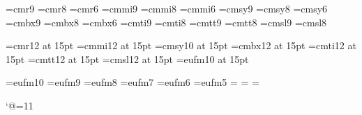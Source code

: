 \magnification{}

\font\ninerm=cmr9  \font\eightrm=cmr8  \font\sixrm=cmr6
\font\ninei=cmmi9  \font\eighti=cmmi8  \font\sixi=cmmi6
\font\ninesy=cmsy9 \font\eightsy=cmsy8 \font\sixsy=cmsy6
\font\ninebf=cmbx9 \font\eightbf=cmbx8 \font\sixbf=cmbx6
\font\nineit=cmti9 \font\eightit=cmti8
\font\ninett=cmtt9 \font\eighttt=cmtt8
\font\ninesl=cmsl9 \font\eightsl=cmsl8


\font\twelverm=cmr12 at 15pt
\font\twelvei=cmmi12 at 15pt
\font\twelvesy=cmsy10 at 15pt
\font\twelvebf=cmbx12 at 15pt
\font\twelveit=cmti12 at 15pt
\font\twelvett=cmtt12 at 15pt
\font\twelvesl=cmsl12 at 15pt
\font\twelvegoth=eufm10 at 15pt

\font\tengoth=eufm10  \font\ninegoth=eufm9
\font\eightgoth=eufm8 \font\sevengoth=eufm7
\font\sixgoth=eufm6   \font\fivegoth=eufm5
\newfam\gothfam \def\goth{\fam\gothfam\tengoth}
\textfont\gothfam=\tengoth
\scriptfont\gothfam=\sevengoth
\scriptscriptfont\gothfam=\fivegoth

\catcode`@=11
\newskip\ttglue

\def\tenpoint{\def\rm{\fam0\tenrm}
  \textfont0=\tenrm \scriptfont0=\sevenrm
  \scriptscriptfont0\fiverm
  \textfont1=\teni \scriptfont1=\seveni
  \scriptscriptfont1\fivei
  \textfont2=\tensy \scriptfont2=\sevensy
  \scriptscriptfont2\fivesy
  \textfont3=\tenex \scriptfont3=\tenex
  \scriptscriptfont3\tenex
  \textfont\itfam=\tenit\def\it{\fam\itfam\tenit}%
  \textfont\slfam=\tensl\def\sl{\fam\slfam\tensl}%
  \textfont\ttfam=\tentt\def\tt{\fam\ttfam\tentt}%
  \textfont\gothfam=\tengoth\scriptfont\gothfam=\sevengoth
  \scriptscriptfont\gothfam=\fivegoth
  \def\goth{\fam\gothfam\tengoth}
  \textfont\bffam=\tenbf\scriptfont\bffam=\sevenbf
  \scriptscriptfont\bffam=\fivebf
  \def\bf{\fam\bffam\tenbf}%
  \tt\ttglue=.5em plus.25em minus.15em
  \normalbaselineskip=12pt \setbox\strutbox\hbox{\vrule
  height8.5pt depth3.5pt width0pt}%
  \let\big=\tenbig\normalbaselines\rm}

\def\ninepoint{\def\rm{\fam0\ninerm}
  \textfont0=\ninerm \scriptfont0=\sixrm
  \scriptscriptfont0\fiverm
  \textfont1=\ninei \scriptfont1=\sixi
  \scriptscriptfont1\fivei
  \textfont2=\ninesy \scriptfont2=\sixsy
  \scriptscriptfont2\fivesy
  \textfont3=\tenex \scriptfont3=\tenex
  \scriptscriptfont3\tenex
  \textfont\itfam=\nineit\def\it{\fam\itfam\nineit}%
  \textfont\slfam=\ninesl\def\sl{\fam\slfam\ninesl}%
  \textfont\ttfam=\ninett\def\tt{\fam\ttfam\ninett}%
  \textfont\gothfam=\ninegoth\scriptfont\gothfam=\sixgoth
  \scriptscriptfont\gothfam=\fivegoth
  \def\goth{\fam\gothfam\tengoth}
  \textfont\bffam=\ninebf\scriptfont\bffam=\sixbf
  \scriptscriptfont\bffam=\fivebf
  \def\bf{\fam\bffam\ninebf}%
  \tt\ttglue=.5em plus.25em minus.15em
  \normalbaselineskip=11pt \setbox\strutbox\hbox{\vrule
  height8pt depth3pt width0pt}%
  \let\big=\ninebig\normalbaselines\rm}

